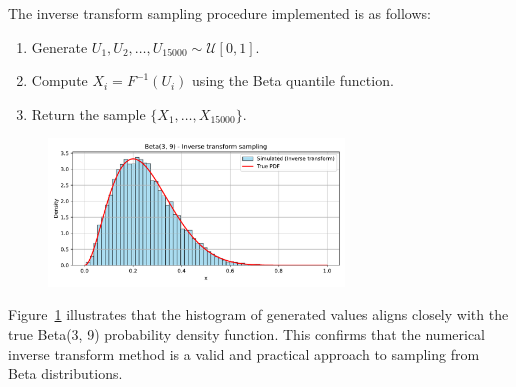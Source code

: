The inverse transform sampling procedure implemented is as follows:
\begin{enumerate}
    \item Generate \(U_1, U_2, \dots, U_{15000} \sim \mathcal{U}[0, 1]\).
    \item Compute \(X_i = F^{-1}(U_i)\) using the Beta quantile function.
    \item Return the sample \(\{X_1, \dots, X_{15000}\}\).
\end{enumerate}

\begin{figure}[H]
    \centering
    \includegraphics[width=0.7\textwidth]{resources/figures/q2-beta_inverse_transform_sampling.pdf}
    \label{fig:q2-beta_inverse}
\end{figure}

Figure~\ref{fig:q2-beta_inverse} illustrates that the histogram of generated values aligns closely with the true Beta(3, 9) probability density function. This confirms that the numerical inverse transform method is a valid and practical approach to sampling from Beta distributions.








